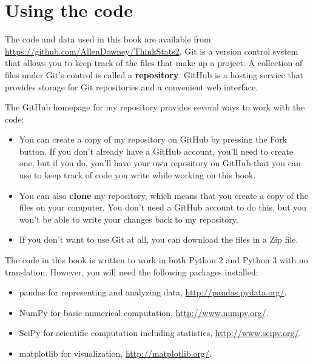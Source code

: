 \documentclass[12pt]{book}
\begin{document}
\section*{Using the code}
\label{code}

The code and data used in this book are available from
\url{https://github.com/AllenDowney/ThinkStats2}.  Git is a version
control system that allows you to keep track of the files that
make up a project.  A collection of files under Git's control is
called a {\bf repository}.  GitHub is a hosting service that provides
storage for Git repositories and a convenient web interface.

The GitHub homepage for my repository provides several ways to
work with the code:

\begin{itemize}

\item You can create a copy of my repository
on GitHub by pressing the {\sf Fork} button.  If you don't already
have a GitHub account, you'll need to create one, but if you do, you'll
have your own repository on GitHub that you can use to keep track
of code you write while working on this book.

\item You can also {\bf clone}
my repository, which means that you create a copy of the files on
your computer.  You don't need a GitHub account to do this, but you
won't be able to write your changes back to my repository.

\item If you don't want to use Git at all, you can download the files
in a Zip file.

\end{itemize}

The code in this book is written to work in both Python 2 and Python 3
with no translation.  However, you will need the following packages
installed: 

\begin{itemize}

\item pandas for representing and analyzing data,
  \url{http://pandas.pydata.org/}.

\item NumPy for basic numerical computation, \url{http://www.numpy.org/}.

\item SciPy for scientific computation including statistics,
  \url{http://www.scipy.org/}.

\item matplotlib for visualization, \url{http://matplotlib.org/}.

\end{itemize}
\end{document}

